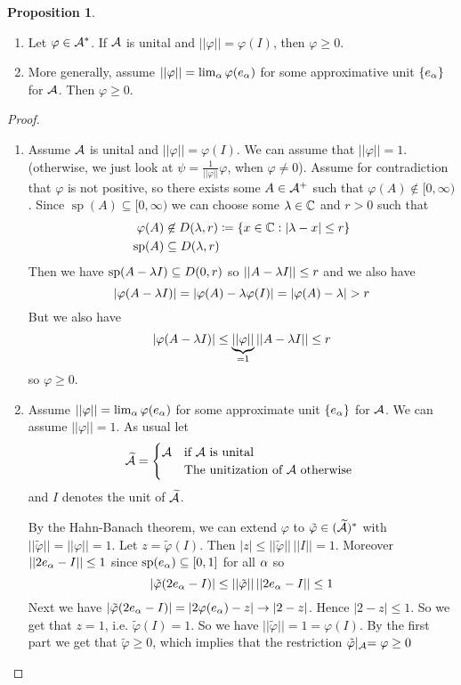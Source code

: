 \documentclass[10pt,english,a4paper]{article}
\theoremstyle{definition}
\newtheorem*{proposition}{Proposition}
\def\tAs{\widetilde{\As}}
\def\tvphi{\tilde{\varphi}}
\DeclareMathOperator{\Sp}{sp}
\def\vphi{\varphi}
\begin{document}
\begin{proposition}\leavevmode
\begin{enumerate}[(1)]
    \item 
    Let $\varphi \in \mathcal{A}^*$. If $\mathcal{A}$ is unital and $||\varphi|| = \varphi(I)$, 
then $\varphi \geq 0$.
\item More generally, assume $||\varphi|| = \lim_{\alpha}\varphi(e_{\alpha})$ for some
approximative unit $\{e_{\alpha}\}$ for $\mathcal{A}$. Then $\varphi \geq 0$.

\end{enumerate}

\end{proposition}
\begin{proof}
\begin{enumerate}[(1)]
    \item 
    Assume $\mathcal{A}$ is unital and $||\varphi|| = \varphi(I)$. We can assume that
$||\varphi||= 1$. (otherwise, we just look at $\psi =
\frac{1}{||\varphi||}\varphi$, when $\varphi\neq 0$). Assume for contradiction
that $\varphi$ is not positive, so there exists some $A\in \mathcal{A}^+$ such that
$\varphi(A)\not\in [0,\infty)$. 
Since $\Sp(A) \subseteq [0,\infty)$ we can choose some $\lambda \in \mathbb{C}$
and $r> 0$ such that 
\begin{align*}
\varphi(A) &\not\in D(\la, r)\coloneqq \{ x \in \C: |\la -x|\leq r \} \\ 
\Sp(A) &\subseteq D(\la,r)
\end{align*}
Then we have $\Sp(A -\la I) \subseteq D(0,r)$ so $||A-\lambda I||\leq r$ and 
we also have 
\[ |\varphi(A-\lambda I)|  = |\varphi(A) - \lambda \varphi(I)| = 
|\varphi(A) - \lambda| > r\]
But we also have
\[ |\varphi(A-\lambda I)| \leq \underbrace{||\varphi||}_{=1} ||A-\lambda I ||\leq r \]
so $\varphi \geq 0$.

\item 
Assume $||\varphi|| = \lim_{\alpha}\varphi(e_{\alpha})$ for some approximate 
unit $\{e_{\alpha}\}$ for $\mathcal{A}$. We can assume $||\varphi||=1$.
As usual let 
\[ \tAs = \begin{cases} \As &\text{if $\As$ is unital}\\ &\text{The unitization of $\As$ otherwise } \end{cases}\]
and $I$ denotes the unit of $\tAs$.

By the Hahn-Banach theorem, we can extend $\varphi$ to $\tilde{\varphi} \in 
(\tAs)^*$ with $||\tilde{\varphi}|| = ||\varphi|| = 1$. 
Let $z = \tvphi(I)$. Then $|z| \leq ||\tvphi||\, ||I||  = 1$. Moreover 
$||2e_{\alpha} - I||\leq 1$ since $\Sp(e_{\al}) \subseteq [0,1]$ for all $\alpha$
so 
\[ |\tvphi(2e_{\al} - I)| \leq ||\tvphi|| \, ||2e_{\al} - I||\leq 1 \]  
Next we have $|\tvphi(2e_{\al} - I)| = |2\vphi(e_{\al}) - z| \to |2-z|$. 
Hence  $|2-z|\leq 1$.
So we get that $z = 1$, i.e. $\tvphi(I) = 1$.
So we have $||\tvphi|| = 1 = \vphi(I)$. By the first part we get that 
$\tvphi \geq 0$, which implies that the restriction $\tvphi\lvert_{\As} = \vphi \geq 0$
\end{enumerate}
\end{proof}
\end{document}
